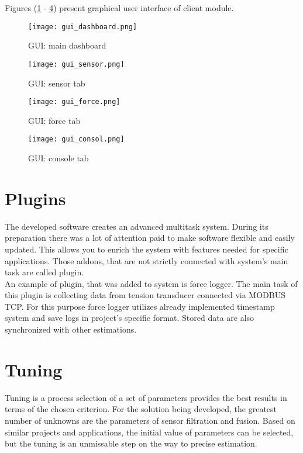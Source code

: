 Figures (\ref{gui1} - \ref{gui4}) present graphical user interface of client module.

\begin{figure}[!h]
	\centering
	\texttt{[image: gui\_dashboard.png]}
	\caption{GUI: main dashboard}
	\label{gui1}
\end{figure}

\begin{figure}[!h]
	\centering
	\texttt{[image: gui\_sensor.png]}
	\caption{GUI: sensor tab}
	\label{gui2}
\end{figure}

\begin{figure}[!h]
	\centering
	\texttt{[image: gui\_force.png]}
	\caption{GUI: force tab}
	\label{gui3}
\end{figure}

\begin{figure}[!h]
	\centering
	\texttt{[image: gui\_consol.png]}
	\caption{GUI: console tab}
	\label{gui4}
\end{figure}

\section{Plugins}

The developed software creates an advanced multitask system. During its preparation there was a lot of attention paid to make software flexible and easily updated. This allows you to enrich the system with features needed for specific applications. Those addons, that are not strictly connected with system's main task are called plugin.\\

An example of plugin, that was added to system is force logger. The main task of this plugin is collecting data from tension transducer connected via MODBUS TCP. For this purpose force logger utilizes already implemented timestamp system and save logs in project's specific format. Stored data are also synchronized with other estimations.

\section{Tuning}

Tuning is a process selection of a set of parameters provides the best results in terms of the chosen criterion. For the solution being developed, the greatest number of unknowns are the parameters of sensor filtration and fusion. Based on similar projects and applications, the initial value of parameters can be selected, but the tuning is an unmissable step on the way to precise estimation.\\

